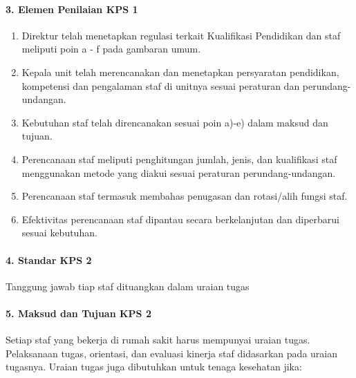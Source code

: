 \documentclass[
]{book}
\providecommand{\tightlist}{%
  \setlength{\itemsep}{0pt}\setlength{\parskip}{0pt}}
\begin{document}
\hypertarget{elemen-penilaian-kps-1}{%
\paragraph*{3. Elemen Penilaian KPS 1}\label{elemen-penilaian-kps-1}}

\begin{enumerate}
\def\labelenumi{\alph{enumi}.}
\tightlist
\item
  Direktur telah menetapkan regulasi terkait Kualifikasi Pendidikan dan staf meliputi poin a - f pada gambaran umum.
\item
  Kepala unit telah merencanakan dan menetapkan persyaratan pendidikan, kompetensi dan pengalaman staf di unitnya sesuai peraturan dan perundang- undangan.
\item
  Kebutuhan staf telah direncanakan sesuai poin a)-e) dalam maksud dan tujuan.
\item
  Perencanaan staf meliputi penghitungan jumlah, jenis, dan kualifikasi staf menggunakan metode yang diakui sesuai peraturan perundang-undangan.
\item
  Perencanaan staf termasuk membahas penugasan dan rotasi/alih fungsi staf.
\item
  Efektivitas perencanaan staf dipantau secara berkelanjutan dan diperbarui sesuai kebutuhan.
\end{enumerate}

\hypertarget{standar-kps-2}{%
\paragraph*{4. Standar KPS 2}\label{standar-kps-2}}

Tanggung jawab tiap staf dituangkan dalam uraian tugas

\hypertarget{maksud-dan-tujuan-kps-2}{%
\paragraph*{5. Maksud dan Tujuan KPS 2}\label{maksud-dan-tujuan-kps-2}}

Setiap staf yang bekerja di rumah sakit harus mempunyai uraian tugas. Pelaksanaan tugas, orientasi, dan evaluasi kinerja staf didasarkan pada uraian tugasnya.
Uraian tugas juga dibutuhkan untuk tenaga kesehatan jika:
\end{document}
